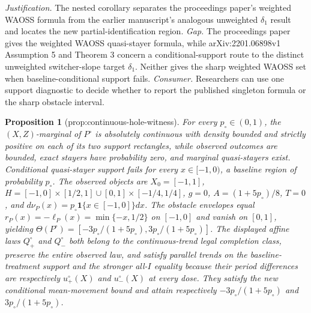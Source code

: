 \documentclass{article}
\newtheorem{proposition}{Proposition}
\begin{document}
\par\smallskip\noindent \textit{Justification.} The nested corollary separates the proceedings paper's weighted WAOSS formula from the earlier manuscript's analogous unweighted \(\delta_1\) result and locates the new partial-identification region. \textit{Gap.} The proceedings paper gives the weighted WAOSS quasi-stayer formula, while arXiv:2201.06898v1 Assumption 5 and Theorem 3 concern a conditional-support route to the distinct unweighted switcher-slope target \(\delta_1\). Neither gives the sharp weighted WAOSS set when baseline-conditional support fails. \textit{Consumer.} Researchers can use one support diagnostic to decide whether to report the published singleton formula or the sharp obstacle interval.

\begin{proposition}[prop:continuous-hole-witness]\label{prop:continuous-hole-witness}
For every \(p_{\circ}\in(0,1)\), the \((X,Z)\)-marginal of \(P^{\circ}\) is absolutely continuous with density bounded and strictly positive on each of its two support rectangles, while observed outcomes are bounded, exact stayers have probability zero, and marginal quasi-stayers exist. Conditional quasi-stayer support fails for every \(x\in[-1,0)\), a baseline region of probability \(p_{\circ}\). The observed objects are \(X_0=[-1,1]\), \(H=[-1,0]\times[1/2,1]\cup[0,1]\times[-1/4,1/4]\), \(g=0\), \(A=(1+5p_{\circ})/8\), \(T=0\), and \(d\nu_P(x)=p_{\circ}\mathbf 1\{x\in[-1,0]\}dx\). The obstacle envelopes equal \(r_P(x)=-\ell_P(x)=\min\{-x,1/2\}\) on \([-1,0]\) and vanish on \([0,1]\), yielding \(\Theta(P^{\circ})=[-3p_{\circ}/(1+5p_{\circ}),3p_{\circ}/(1+5p_{\circ})]\). The displayed affine laws \(Q_+^{\circ}\) and \(Q_-^{\circ}\) both belong to the continuous-trend legal completion class, preserve the entire observed law, and satisfy parallel trends on the baseline-treatment support and the stronger all-\(I\) equality because their period differences are respectively \(u_+^{\circ}(X)\) and \(u_-^{\circ}(X)\) at every dose. They satisfy the new conditional mean-movement bound and attain respectively \(-3p_{\circ}/(1+5p_{\circ})\) and \(3p_{\circ}/(1+5p_{\circ})\).
\end{proposition}
\end{document}

